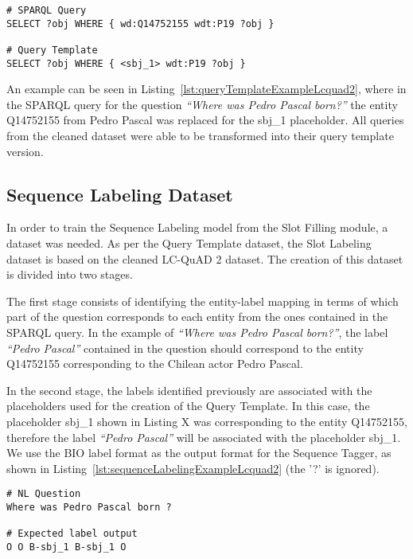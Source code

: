 \begin{lstlisting}[captionpos=b, 
    caption=SPARQL query and its Query Template version., 
    label=lst:queryTemplateExampleLcquad2,
    basicstyle=\ttfamily,frame=single]
# SPARQL Query
SELECT ?obj WHERE { wd:Q14752155 wdt:P19 ?obj }

# Query Template
SELECT ?obj WHERE { <sbj_1> wdt:P19 ?obj }
\end{lstlisting}

An example can be seen in Listing~\ref{lst:queryTemplateExampleLcquad2}, where in the SPARQL 
query for the question \textit{“Where was Pedro Pascal born?”} the entity Q14752155 from Pedro 
Pascal was replaced for the sbj\_1 placeholder. All queries from the cleaned dataset were able 
to be transformed into their query template version.

\subsection{Sequence Labeling Dataset}
\label{cap4:experimentalDesign/QaDataset/queryTemplate}
In order to train the Sequence Labeling model from the Slot Filling module, a dataset was 
needed. As per the Query Template dataset, the Slot Labeling dataset is based on the cleaned 
LC-QuAD 2 dataset. The creation of this dataset is divided into two stages. 

The first stage consists of identifying the entity-label mapping in terms of which part of the 
question corresponds to each entity from the ones contained in the SPARQL query. In the example 
of \textit{“Where was Pedro Pascal born?”}, the label \textit{“Pedro Pascal”} contained in the 
question should correspond to the entity Q14752155 corresponding to the Chilean actor Pedro 
Pascal. 

In the second stage, the labels identified previously are associated with the placeholders used 
for the creation of the Query Template. In this case, the placeholder sbj\_1 shown in Listing X 
was corresponding to the entity Q14752155, therefore the label \textit{“Pedro Pascal”} will be 
associated with the placeholder sbj\_1. We use the BIO label format as the output format for the
Sequence Tagger, as shown in Listing~\ref{lst:sequenceLabelingExampleLcquad2} (the '?' is 
ignored).

\begin{lstlisting}[captionpos=b, 
    caption=BIO label representation for a Natural Language Question., 
    label=lst:sequenceLabelingExampleLcquad2,
    basicstyle=\ttfamily,frame=single]
# NL Question
Where was Pedro Pascal born ?

# Expected label output
O O B-sbj_1 B-sbj_1 O
\end{lstlisting}

